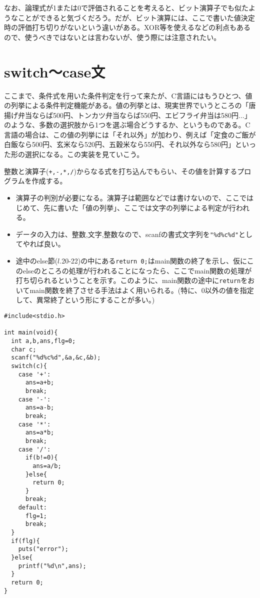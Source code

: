 なお、論理式が1または0で評価されることを考えると、ビット演算子でも似たようなことができると気づくだろう。だが、ビット演算には、ここで書いた値決定時の評価打ち切りがないという違いがある。XOR等を使えるなどの利点もあるので、使うべきではないとは言わないが、使う際には注意されたい。

\section{switch〜case文}
ここまで、条件式を用いた条件判定を行って来たが、C言語にはもうひとつ、値の列挙による条件判定機能がある。値の列挙とは、現実世界でいうところの「唐揚げ弁当ならば500円、トンカツ弁当ならば550円、エビフライ弁当は580円...」のような、多数の選択肢から1つを選ぶ場合どうするか、というものである。C言語の場合は、この値の列挙には「それ以外」が加わり、例えば「定食のご飯が白飯なら500円、玄米なら520円、五穀米なら550円、それ以外なら580円」といった形の選択になる。この実装を見ていこう。
\begin{boxnote}
\begin{multicols}{2}
整数と演算子(\verb|+,-,*,/|)からなる式を打ち込んでもらい、その値を計算するプログラムを作成する。
\begin{itemize}
\item 演算子の判別が必要になる。演算子は範囲などでは書けないので、ここではじめて、先に書いた「値の列挙」、ここでは文字の列挙による判定が行われる。
\item データの入力は、整数,文字,整数なので、scanfの書式文字列を\verb|"%d%c%d"|としてやれば良い。
\item 途中のelse節($l$.20-22)の中にある\verb|return 0;|はmain関数の終了を示し、仮にこのelseのところの処理が行われることになったら、ここでmain関数の処理が打ち切られるということを示す。このように、main関数の途中に\verb|return|をおいてmain関数を終了させる手法はよく用いられる。(特に、0以外の値を指定して、異常終了という形にすることが多い。)
\end{itemize}
\begin{lstlisting}[caption=計算式を打ち込む四則演算,label=program4_4]
#include<stdio.h>

int main(void){
  int a,b,ans,flg=0;
  char c;
  scanf("%d%c%d",&a,&c,&b);
  switch(c){
    case '+':
      ans=a+b;
      break;
    case '-':
      ans=a-b;
      break;
    case '*':
      ans=a*b;
      break;
    case '/':
      if(b!=0){
        ans=a/b;
      }else{
        return 0;
      }
      break;
    default:
      flg=1;
      break;
  }
  if(flg){
    puts("error");
  }else{
    printf("%d\n",ans);
  }
  return 0;
}
\end{lstlisting}
\end{multicols}
\end{boxnote}

